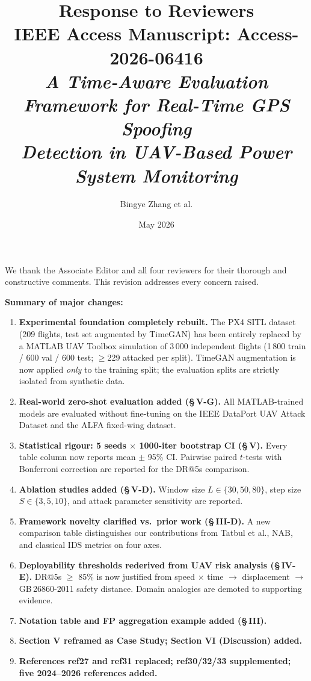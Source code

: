\documentclass[11pt, a4paper]{article}
\title{Response to Reviewers\\[6pt]
  \large IEEE Access Manuscript: Access-2026-06416\\
  \normalsize \textit{A Time-Aware Evaluation Framework for Real-Time GPS Spoofing\\
  Detection in UAV-Based Power System Monitoring}}
\author{Bingye Zhang et al.}
\date{May 2026}
\begin{document}
\maketitle

\noindent
We thank the Associate Editor and all four reviewers for their thorough and
constructive comments. This revision addresses every concern raised.

\medskip
\noindent\textbf{Summary of major changes:}
\begin{enumerate}[leftmargin=*, label={\arabic*.}]
  \item \textbf{Experimental foundation completely rebuilt.}
    The PX4 SITL dataset (209 flights, test set augmented by TimeGAN) has been
    entirely replaced by a MATLAB UAV Toolbox simulation of 3\,000 independent
    flights (1\,800 train / 600 val / 600 test; $\geq$229 attacked per split).
    TimeGAN augmentation is now applied \emph{only} to the training split;
    the evaluation splits are strictly isolated from synthetic data.
  \item \textbf{Real-world zero-shot evaluation added (\S\,V-G).}
    All MATLAB-trained models are evaluated without fine-tuning on the
    IEEE DataPort UAV Attack Dataset and the ALFA fixed-wing dataset.
  \item \textbf{Statistical rigour: 5 seeds $\times$ 1000-iter bootstrap CI (\S\,V).}
    Every table column now reports mean $\pm$ 95\% CI.
    Pairwise paired $t$-tests with Bonferroni correction are reported for the
    DR@5s comparison.
  \item \textbf{Ablation studies added (\S\,V-D).}
    Window size $L\in\{30,50,80\}$, step size $S\in\{3,5,10\}$, and attack
    parameter sensitivity are reported.
  \item \textbf{Framework novelty clarified vs.\ prior work (\S\,III-D).}
    A new comparison table distinguishes our contributions from Tatbul et al.,
    NAB, and classical IDS metrics on four axes.
  \item \textbf{Deployability thresholds rederived from UAV risk analysis (\S\,IV-E).}
    DR@5s $\geq$ 85\% is now justified from speed $\times$ time $\to$ displacement
    $\to$ GB\,26860-2011 safety distance. Domain analogies are demoted to
    supporting evidence.
  \item \textbf{Notation table and FP aggregation example added (\S\,III).}
  \item \textbf{Section V reframed as Case Study; Section VI (Discussion) added.}
  \item \textbf{References ref27 and ref31 replaced; ref30/32/33 supplemented;
    five 2024--2026 references added.}
\end{enumerate}
\end{document}

